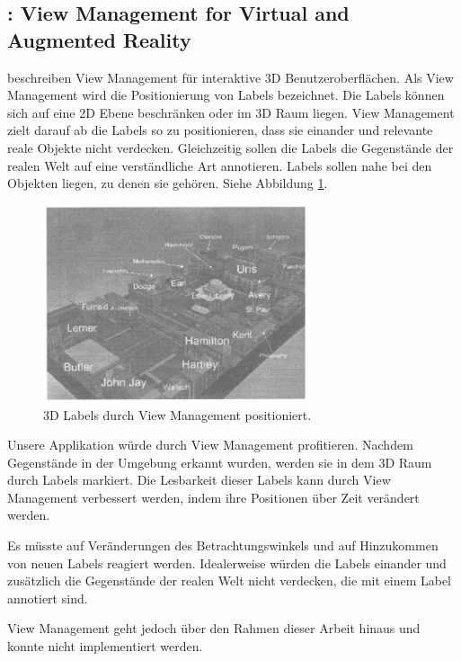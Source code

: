 \subsection{\cite{viewmanagement3d}: View Management for Virtual and Augmented Reality}

\cite{viewmanagement3d} beschreiben View Management für interaktive 3D Benutzeroberflächen. Als View Management wird die Positionierung von Labels bezeichnet.
Die Labels können sich auf eine 2D Ebene beschränken oder im 3D Raum liegen. View Management zielt darauf ab die Labels so zu positionieren, dass sie einander und relevante reale Objekte nicht verdecken. Gleichzeitig sollen die Labels die Gegenstände der realen Welt auf eine verständliche Art annotieren. Labels sollen nahe bei den Objekten liegen, zu denen sie gehören. Siehe Abbildung \ref{viewManagement}.

\begin{figure}[H]
	\centering
	\includegraphics[width=0.7\textwidth]{images/img_viewmanagement.PNG}
	\caption[]{3D Labels durch View Management positioniert.\citep{viewmanagement3d}}
	\label{viewManagement}
\end{figure}

Unsere Applikation würde durch View Management profitieren. Nachdem Gegenstände in der Umgebung erkannt wurden, werden sie in dem 3D Raum durch Labels markiert. Die Lesbarkeit dieser Labels kann durch View Management verbessert werden, indem ihre Positionen über Zeit verändert werden. 

Es müsste auf Veränderungen des Betrachtungswinkels und auf Hinzukommen von neuen Labels reagiert werden. Idealerweise würden die Labels einander und zusätzlich die Gegenstände der realen Welt nicht verdecken, die mit einem Label annotiert sind. 

View Management geht jedoch über den Rahmen dieser Arbeit hinaus und konnte nicht implementiert werden. \citep{viewmanagement3d}



